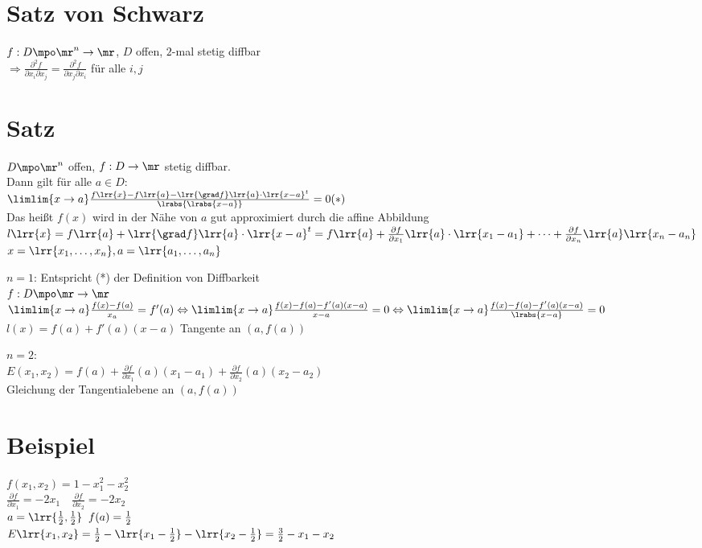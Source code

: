 \section{Satz von Schwarz}
	$f:D\mpo\mr^n\rightarrow\mr$, $D$ offen, $2$-mal stetig diffbar\\
	$\Rightarrow \frac{\partial^2 f}{\partial x_i\partial x_j}=\frac{\partial^2 f}{\partial x_j\partial x_i}$ für alle $i,j$

\section{Satz}
	$D\mpo\mr^n$ offen, $f:D\rightarrow\mr$ stetig diffbar.\\
	Dann gilt für alle $a\in D$:\\
	$\limlim{x\rightarrow a} \frac{f\lrr{x}-f\lrr{a}-\lrr{\grad f}\lrr{a}\cdot\lrr{x-a}^t}{\lrabs{\lrabs{x-a}}}=0 (*)$\\
	Das heißt $f(x)$ wird in der Nähe von $a$ gut approximiert durch die affine Abbildung\\
	$l\lrr{x}=f\lrr{a}+\lrr{\grad f}\lrr{a}\cdot\lrr{x-a}^t=f\lrr{a}+\frac{\partial f}{\partial x_1}\lrr{a}\cdot\lrr{x_1-a_1}+\dots+\frac{\partial f}{\partial x_n}\lrr{a}\lrr{x_n-a_n}$\\
	$x=\lrr{x_1,\dots,x_n}, a=\lrr{a_1,\dots,a_n}$

	$n=1$: Entspricht (*) der Definition von Diffbarkeit\\
	$f:D\mpo\mr\rightarrow\mr$\\
	$\limlim{x\rightarrow a}\frac{f(x)-f(a)}{x_a} = f'(a)\Leftrightarrow\limlim{x\rightarrow a}\frac{f(x)-f(a)-f'(a)(x-a)}{x-a}=0 \Leftrightarrow\limlim{x\rightarrow a}\frac{f(x)-f(a)-f'(a)(x-a)}{\lrabs{x-a}}=0$\\
	$l(x)=f(a)+f'(a)(x-a)$ Tangente an $(a,f(a))$

	$n=2$:\\
	$E(x_1,x_2)=f(a)+\frac{\partial f}{\partial x_1}(a)(x_1-a_1)+\frac{\partial f}{\partial x_2}(a)(x_2-a_2)$\\
	Gleichung der Tangentialebene an $(a,f(a))$

\section{Beispiel}
	$f(x_1,x_2)=1-x_1^2-x_2^2$\\
	$\frac{\partial f}{\partial x_1} = -2x_1\quad\frac{\partial f}{\partial x_2}=-2x_2$\\
	$a=\lrr{\frac{1}{2},\frac{1}{2}}\;\; f(a)=\frac{1}{2}$\\
	$E\lrr{x_1,x_2}=\frac{1}{2} - \lrr{x_1-\frac{1}{2}}-\lrr{x_2-\frac{1}{2}}=\frac{3}{2}-x_1-x_2$

